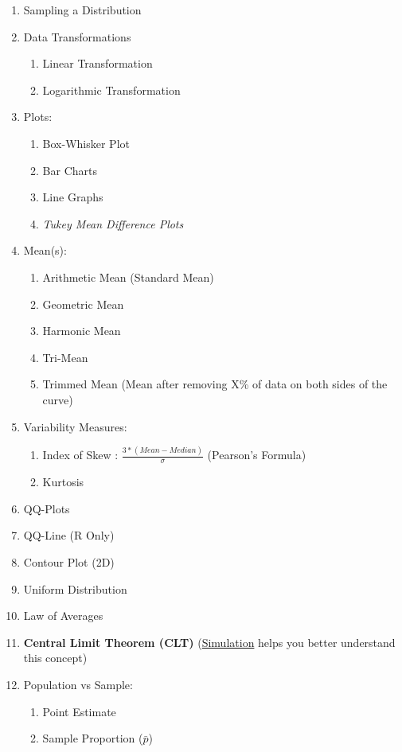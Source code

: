 \documentclass[11pt]{article}
\begin{document}
\begin{enumerate}
\begin{enumerate}
		\end{enumerate}
		\item Sampling a Distribution
		\item Data Transformations
		\begin{enumerate}
			\item Linear Transformation
			\item Logarithmic Transformation
		\end{enumerate}
		\item Plots:
		\begin{enumerate}
			\item Box-Whisker Plot
			\item Bar Charts
			\item Line Graphs
			\item \textit{Tukey Mean Difference Plots}
		\end{enumerate}
		\item Mean(s):
		\begin{enumerate}
			\item Arithmetic Mean (Standard Mean)
			\item Geometric Mean
			\item Harmonic Mean
			\item Tri-Mean
			\item Trimmed Mean (Mean after removing X\%  of data on both sides of the curve)
		\end{enumerate}
		\item Variability Measures:
		\begin{enumerate}
			\item Index of Skew :  $ \frac{3 * ( Mean - Median )}{ \sigma }$ (Pearson's Formula)
			\item Kurtosis
		\end{enumerate}
		\item QQ-Plots
		\item QQ-Line (R Only)
		\item Contour Plot (2D)
		\item Uniform Distribution
		\item Law of Averages
		\item \textbf{Central Limit Theorem (CLT)} (\href{http://onlinestatbook.com/2/sampling_distributions/clt_demo.html}{Simulation} helps you better understand this concept)
		\item Population vs Sample:
		\begin{enumerate}
			\item Point Estimate
			\item Sample Proportion ($\bar{p}$)

\end{enumerate}
\end{enumerate}
\end{document}
